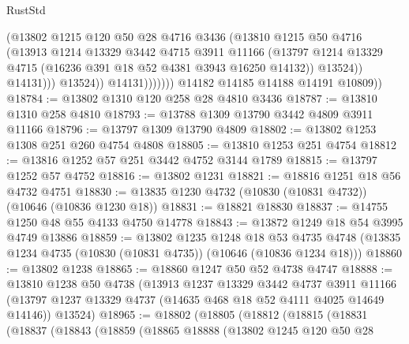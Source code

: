 \begin{lexlean}{RustStd}
\begin{coremodule}
                              (@13802
                                @1215
                                @120
                                @50
                                @28
                                @4716
                                @3436
                                (@13810
                                  @1215
                                  @50
                                  @4716
                                  (@13913
                                    @1214
                                    @13329
                                    @3442
                                    @4715
                                    @3911
                                    @11166
                                    (@13797
                                      @1214
                                      @13329
                                      @4715
                                      (@16236 @391 @18 @52 @4381 @3943 @16250 @14132))
                                    @13524))
                                @14131)))
                          @13524))
                      @14131)))))))
        @14182
        @14185
        @14188
        @14191
        @10809))
@18784 := @13802 @1310 @120 @258 @28 @4810 @3436
@18787 := @13810 @1310 @258 @4810
@18793 := @13788 @1309 @13790 @3442 @4809 @3911 @11166
@18796 := @13797 @1309 @13790 @4809
@18802 := @13802 @1253 @1308 @251 @260 @4754 @4808
@18805 := @13810 @1253 @251 @4754
@18812 := @13816 @1252 @57 @251 @3442 @4752 @3144 @1789
@18815 := @13797 @1252 @57 @4752
@18816 := @13802 @1231
@18821 := @18816 @1251 @18 @56 @4732 @4751
@18830 := @13835 @1230 @4732 (@10830 (@10831 @4732)) (@10646 (@10836 @1230 @18))
@18831 := @18821 @18830
@18837 := @14755 @1250 @48 @55 @4133 @4750 @14778
@18843 := @13872 @1249 @18 @54 @3995 @4749 @13886
@18859 := @13802
    @1235
    @1248
    @18
    @53
    @4735
    @4748
    (@13835 @1234 @4735 (@10830 (@10831 @4735)) (@10646 (@10836 @1234 @18)))
@18860 := @13802 @1238
@18865 := @18860 @1247 @50 @52 @4738 @4747
@18888 := @13810
    @1238
    @50
    @4738
    (@13913
      @1237
      @13329
      @3442
      @4737
      @3911
      @11166
      (@13797 @1237 @13329 @4737 (@14635 @468 @18 @52 @4111 @4025 @14649 @14146))
      @13524)
@18965 := @18802
    (@18805
      (@18812
        (@18815
          (@18831
            (@18837
              (@18843
                (@18859
                  (@18865
                    @18888
                    (@13802
                      @1245
                      @120
                      @50
                      @28

\end{coremodule}
\end{lexlean}
